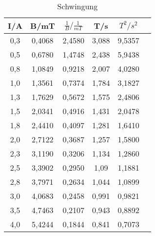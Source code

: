 %
%
%
%
%




\begin{table}[h!]
  \centering
  \caption{Schwingung}
  \label{tab:schwing}
  \begin{tabular}{c c c c c c }
    \toprule
     I/A &		B/mT	& $\frac{1}{B}/\frac{1}{mT}$ & T/s	& $T^2/s^2$\\
    \midrule
    0,3	& 	0,4068	  & 2,4580	&   3,088 & 	9,5357 \\
    0,5	& 	0,6780		& 1,4748  &   2,438 & 	5,9438 \\
    0,8	& 	1,0849		& 0,9218	&   2,007 & 	4,0280 \\
    1,0 & 	1,3561 		& 0,7374  &   1,784 & 	3,1827 \\
    1,3	& 	1,7629		& 0,5672	&   1,575 & 	2,4806 \\
    1,5	& 	2,0341	  & 0,4916  &   1,431 & 	2,0478 \\
    1,8	& 	2,4410	  & 0,4097  &   1,281 & 	1,6410 \\
    2,0	& 	2,7122 		& 0,3687	&   1,257 & 	1,5800 \\
    2,3	& 	3,1190		& 0,3206	&   1,134 & 	1,2860 \\
    2,5	& 	3,3902		& 0,2950  &   1,09  &   1,1881 \\
    2,8	& 	3,7971		& 0,2634	&   1,044 & 	1,0899 \\
    3,0	& 	4,0683 		& 0,2458  &   0,991 & 	0,9821 \\
    3,5	& 	4,7463		& 0,2107	&   0,943 & 	0,8892 \\
    4,0 & 	5,4244  	& 0,1844	&   0,841 & 	0,7073 \\
    \bottomrule
  \end{tabular}
\end{table}

%
